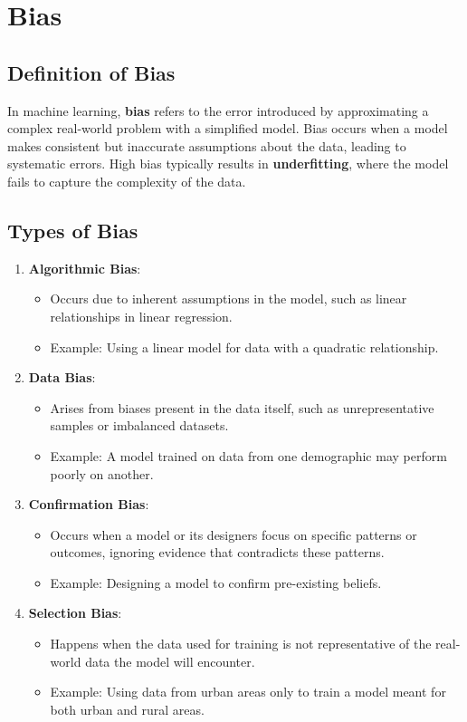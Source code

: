 \section{Bias}

\subsection*{Definition of Bias}
In machine learning, \textbf{bias} refers to the error introduced by approximating a complex real-world problem with a simplified model. Bias occurs when a model makes consistent but inaccurate assumptions about the data, leading to systematic errors. High bias typically results in \textbf{underfitting}, where the model fails to capture the complexity of the data.

\subsection*{Types of Bias}
\begin{enumerate}
    \item \textbf{Algorithmic Bias}:
    \begin{itemize}
        \item Occurs due to inherent assumptions in the model, such as linear relationships in linear regression.
        \item Example: Using a linear model for data with a quadratic relationship.
    \end{itemize}
    \item \textbf{Data Bias}:
    \begin{itemize}
        \item Arises from biases present in the data itself, such as unrepresentative samples or imbalanced datasets.
        \item Example: A model trained on data from one demographic may perform poorly on another.
    \end{itemize}
    \item \textbf{Confirmation Bias}:
    \begin{itemize}
        \item Occurs when a model or its designers focus on specific patterns or outcomes, ignoring evidence that contradicts these patterns.
        \item Example: Designing a model to confirm pre-existing beliefs.
    \end{itemize}
    \item \textbf{Selection Bias}:
    \begin{itemize}
        \item Happens when the data used for training is not representative of the real-world data the model will encounter.
        \item Example: Using data from urban areas only to train a model meant for both urban and rural areas.
    \end{itemize}
\end{enumerate}

